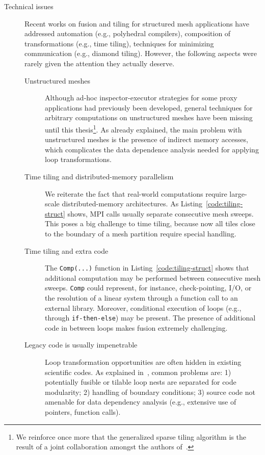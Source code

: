 \begin{description}
\item[Technical issues] Recent works on fusion and tiling for structured mesh applications have addressed automation (e.g., polyhedral compilers), composition of transformations (e.g., time tiling), techniques for minimizing communication (e.g., diamond tiling). However, the following aspects were rarely given the attention they actually deserve.
\begin{description}
\item[Unstructured meshes] Although ad-hoc inspector-executor strategies for some proxy applications had previously been developed, general techniques for arbitrary computations on unstructured meshes have been missing until this thesis\footnote{We reinforce once more that the generalized sparse tiling algorithm is the result of a joint collaboration amongst the authors of~\citep{st-paper}.}. As already explained, the main problem with unstructured meshes is the presence of indirect memory accesses, which complicates the data dependence analysis needed for applying loop transformations.
\item[Time tiling and distributed-memory parallelism] We reiterate the fact that real-world computations require large-scale distributed-memory architectures. As Listing~\ref{code:tiling-struct} shows, MPI calls usually separate consecutive mesh sweeps. This poses a big challenge to time tiling, because now all tiles close to the boundary of a mesh partition require special handling.
\item[Time tiling and extra code] The {\tt Comp(...)} function in Listing~\ref{code:tiling-struct} shows that additional computation may be performed between consecutive mesh sweeps. {\tt Comp} could represent, for instance, check-pointing, I/O, or the resolution of a linear system through a function call to an external library. Moreover, conditional execution of loops (e.g., through \texttt{if-then-else}) may be present. The presence of additional code in between loops makes fusion extremely challenging. 
\item[Legacy code is usually impenetrable] Loop transformation opportunities are often hidden in existing scientific codes. As explained in~\cite{strout-common-problems}, common problems are: 1) potentially fusible or tilable loop nests are separated for code modularity; 2) handling of boundary conditions; 3) source code not amenable for data dependency analysis (e.g., extensive use of pointers, function calls).
\end{description}


\end{description}
